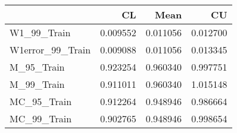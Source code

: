\begin{tabular}{lrrr}
\toprule
{} &        CL &      Mean &        CU \\
\midrule
W1\_99\_Train      &  0.009552 &  0.011056 &  0.012700 \\
W1error\_99\_Train &  0.009088 &  0.011056 &  0.013345 \\
M\_95\_Train       &  0.923254 &  0.960340 &  0.997751 \\
M\_99\_Train       &  0.911011 &  0.960340 &  1.015148 \\
MC\_95\_Train      &  0.912264 &  0.948946 &  0.986664 \\
MC\_99\_Train      &  0.902765 &  0.948946 &  0.998654 \\
\bottomrule
\end{tabular}
